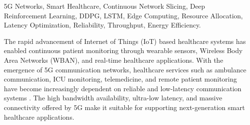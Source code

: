 \documentclass[10pt,journal,compsoc]{IEEEtran}
\begin{document}
{\begin{abstract}
A multi-objective optimization model is developed by jointly considering end-to-end latency, reliability, throughput, power consumption, and resource energy utilization as key performance metrics. The latency model incorporates transmission delay, queueing delay, edge processing delay, AI decision delay, and slice adaptation delay to capture real-time communication performance. The objective is to minimize communication latency and power consumption while maximizing throughput, reliability, and energy-efficient resource utilization for latency-sensitive healthcare services. Experimental evaluation demonstrates that the proposed framework significantly improves adaptive resource allocation efficiency, reduces communication delay, enhances network reliability, and provides an efficient intelligent communication framework for next-generation 5G-enabled smart healthcare systems.
\end{abstract}
\begin{IEEEkeywords}
5G Networks, Smart Healthcare, Continuous Network Slicing, Deep Reinforcement Learning, DDPG, LSTM, Edge Computing, Resource Allocation, Latency Optimization, Reliability, Throughput, Energy Efficiency.
 
\end{IEEEkeywords}}

\maketitle

\IEEEdisplaynontitleabstractindextext

\IEEEpeerreviewmaketitle
   


The rapid advancement of Internet of Things (IoT) based healthcare systems has enabled continuous patient monitoring through wearable sensors, Wireless Body Area Networks (WBAN), and real-time healthcare applications. With the emergence of 5G communication networks, healthcare services such as ambulance communication, ICU monitoring, telemedicine, and remote patient monitoring have become increasingly dependent on reliable and low-latency communication systems \cite{zhai2021ambulance}. The high bandwidth availability, ultra-low latency, and massive connectivity offered by 5G make it suitable for supporting next-generation smart healthcare applications.
\end{document}

